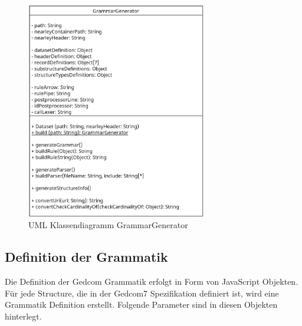 \begin{figure}[h]
	\centering
	\includegraphics[width=0.7\textwidth]{images/UML_Class_GrammarGenerator.png}
	\caption{UML Klassendiagramm GrammarGenerator}
	\label{fig: UML Klassendiagramm GrammarGenerator}
\end{figure}

\subsection{Definition der Grammatik}
\label{subsec: Implementierung - Grammatik Generator - Definition der Grammatik}
Die Definition der Gedcom Grammatik erfolgt in Form von JavaScript Objekten. Für jede Structure, die in der Gedcom7 Spezifikation definiert ist, wird eine Grammatik Definition erstellt. Folgende Parameter sind in diesen Objekten hinterlegt.


